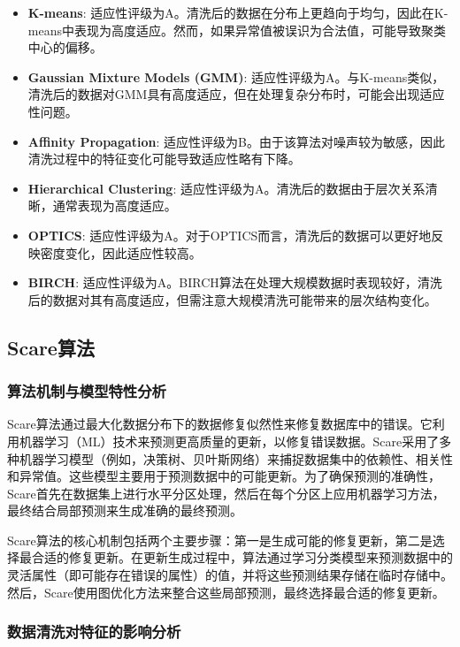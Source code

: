 \documentclass{ctexart} %
\begin{document}
\begin{itemize}
    \item \textbf{K-means}: 适应性评级为A。清洗后的数据在分布上更趋向于均匀，因此在K-means中表现为高度适应。然而，如果异常值被误识为合法值，可能导致聚类中心的偏移。
    \item \textbf{Gaussian Mixture Models (GMM)}: 适应性评级为A。与K-means类似，清洗后的数据对GMM具有高度适应，但在处理复杂分布时，可能会出现适应性问题。
    \item \textbf{Affinity Propagation}: 适应性评级为B。由于该算法对噪声较为敏感，因此清洗过程中的特征变化可能导致适应性略有下降。
    \item \textbf{Hierarchical Clustering}: 适应性评级为A。清洗后的数据由于层次关系清晰，通常表现为高度适应。
    \item \textbf{OPTICS}: 适应性评级为A。对于OPTICS而言，清洗后的数据可以更好地反映密度变化，因此适应性较高。
    \item \textbf{BIRCH}: 适应性评级为A。BIRCH算法在处理大规模数据时表现较好，清洗后的数据对其有高度适应，但需注意大规模清洗可能带来的层次结构变化。
\end{itemize}

\subsection{Scare算法}

\subsubsection{算法机制与模型特性分析}

Scare算法通过最大化数据分布下的数据修复似然性来修复数据库中的错误。它利用机器学习（ML）技术来预测更高质量的更新，以修复错误数据。Scare采用了多种机器学习模型（例如，决策树、贝叶斯网络）来捕捉数据集中的依赖性、相关性和异常值。这些模型主要用于预测数据中的可能更新。为了确保预测的准确性，Scare首先在数据集上进行水平分区处理，然后在每个分区上应用机器学习方法，最终结合局部预测来生成准确的最终预测。

Scare算法的核心机制包括两个主要步骤：第一是生成可能的修复更新，第二是选择最合适的修复更新。在更新生成过程中，算法通过学习分类模型来预测数据中的灵活属性（即可能存在错误的属性）的值，并将这些预测结果存储在临时存储中。然后，Scare使用图优化方法来整合这些局部预测，最终选择最合适的修复更新。

\subsubsection{数据清洗对特征的影响分析}
\end{document}
